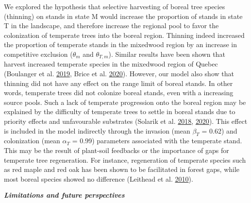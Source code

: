 \documentclass[12pt]{article}
\begin{document}
We explored the hypothesis that selective harvesting of boreal tree
species (thinning) on stands in state M would increase the proportion of
stands in state T in the landscape, and therefore increase the regional
pool to favor the colonization of temperate trees into the boreal
region. Thinning indeed increased the proportion of temperate stands in
the mixedwood region by an increase in competitive exclusion
(\(\theta_{m}\) and \(\theta_{T, m}\)). Similar results have been shown
that harvest increased temperate species in the mixedwood region of
Quebec (Boulanger et al. \protect\hyperlink{ref-Boulanger2019}{2019},
Brice et al. \protect\hyperlink{ref-Brice2020}{2020}). However, our
model also show that thinning did not have any effect on the range limit
of boreal stands. In other words, temperate trees did not colonize
boreal stands, even with a increasing source pools. Such a lack of
temperate progression onto the boreal region may be explained by the
difficulty of temperate trees to settle in boreal stands due to priority
effects and unfavourable substrates (Solarik et al.
\protect\hyperlink{ref-Solarik2018}{2018},
\protect\hyperlink{ref-Solarik2020}{2020}). This effect is included in
the model indirectly through the invasion (mean \(\beta_{T}\) = 0.62)
and colonization (mean \(\alpha_{T}\) = 0.99) parameters associated with
the temperate stand. This may be the result of plant-soil feedbacks or
the importance of gaps for temperate tree regeneration. For instance,
regeneration of temperate species such as red maple and red oak has been
shown to be facilitated in forest gaps, while most boreal species showed
no difference (Leithead et al.
\protect\hyperlink{ref-Leithead2010}{2010}).

\textbf{\emph{Limitations and future perspectives}}
\end{document}
